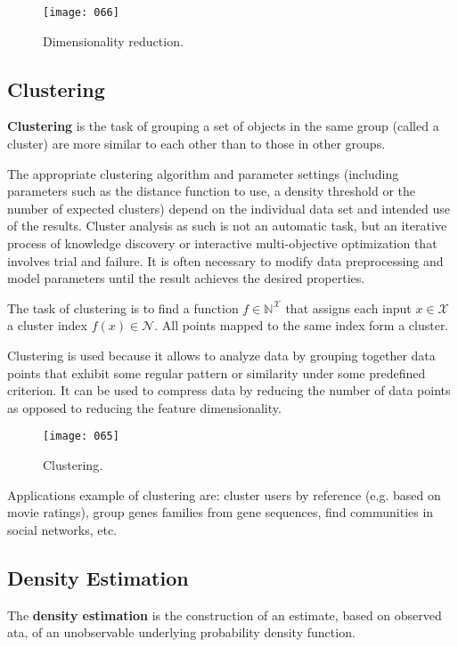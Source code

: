 \begin{figure}[h!]
    \centering
    \texttt{[image: 066]}
    \caption{Dimensionality reduction.}
    \label{fig:066}
\end{figure}

\subsection{Clustering}
\textbf{Clustering} is the task of grouping a set of objects in the same group (called a cluster) are more similar to each other than to those in other groups. 

The appropriate clustering algorithm and parameter settings (including parameters such as the distance function to use, a density threshold or the number of expected clusters) depend on the individual data set and intended use of the results. Cluster analysis as such is not an automatic task, but an iterative process of knowledge discovery or interactive multi-objective optimization that involves trial and failure. It is often necessary to modify data preprocessing and model parameters until the result achieves the desired properties.

The task of clustering is to find a function \(f \in \mathbb{N}^{\mathcal{X}}\) that assigns each input \(x \in \mathcal{X}\) a cluster index \(f(x) \in \mathcal{N}\). All points mapped to the same index form a cluster.

Clustering is used because it allows to analyze data by grouping together data points that exhibit some regular pattern or similarity under some predefined criterion. It can be used to compress data by reducing the number of data points as opposed to reducing the feature dimensionality.

\begin{figure}[h!]
    \centering
    \texttt{[image: 065]}
    \caption{Clustering.}
    \label{fig:065}
\end{figure}

Applications example of clustering are: cluster users by reference (e.g. based on movie ratings), group genes families from gene sequences, find communities in social networks, etc.

\subsection{Density Estimation}
The \textbf{density estimation} is the construction of an estimate, based on observed ata, of an unobservable underlying probability density function. 

